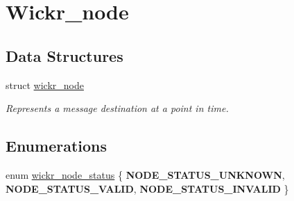 \hypertarget{group__wickr__node}{}\section{Wickr\+\_\+node}
\label{group__wickr__node}
\subsection*{Data Structures}
\begin{DoxyCompactItemize}
\item 
struct \mbox{\hyperlink{structwickr__node}{wickr\+\_\+node}}
\begin{DoxyCompactList}\small\item\em Represents a message destination at a point in time. \end{DoxyCompactList}\end{DoxyCompactItemize}
\subsection*{Enumerations}
\begin{DoxyCompactItemize}
\item 
enum \mbox{\hyperlink{group__wickr__node_gafa0bd3307613292fcd88e38443345e8f}{wickr\+\_\+node\+\_\+status}} \{ {\bfseries N\+O\+D\+E\+\_\+\+S\+T\+A\+T\+U\+S\+\_\+\+U\+N\+K\+N\+O\+WN}, 
{\bfseries N\+O\+D\+E\+\_\+\+S\+T\+A\+T\+U\+S\+\_\+\+V\+A\+L\+ID}, 
{\bfseries N\+O\+D\+E\+\_\+\+S\+T\+A\+T\+U\+S\+\_\+\+I\+N\+V\+A\+L\+ID}
 \}
\end{DoxyCompactItemize}
